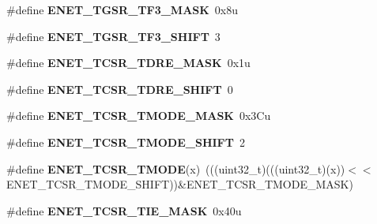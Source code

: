 \begin{DoxyCompactItemize}
\item 
\#define {\bfseries E\+N\+E\+T\+\_\+\+T\+G\+S\+R\+\_\+\+T\+F3\+\_\+\+M\+A\+SK}~0x8u\hypertarget{group__ENET__Register__Masks_ga6346ae30393bacdf198cc24bbb538c4c}{}\label{group__ENET__Register__Masks_ga6346ae30393bacdf198cc24bbb538c4c}

\item 
\#define {\bfseries E\+N\+E\+T\+\_\+\+T\+G\+S\+R\+\_\+\+T\+F3\+\_\+\+S\+H\+I\+FT}~3\hypertarget{group__ENET__Register__Masks_gaf027fca605976ae3ebfc79ba1ba3f0e4}{}\label{group__ENET__Register__Masks_gaf027fca605976ae3ebfc79ba1ba3f0e4}

\item 
\#define {\bfseries E\+N\+E\+T\+\_\+\+T\+C\+S\+R\+\_\+\+T\+D\+R\+E\+\_\+\+M\+A\+SK}~0x1u\hypertarget{group__ENET__Register__Masks_ga37a12f7e1bfb1e1c0a09b6664d09cde8}{}\label{group__ENET__Register__Masks_ga37a12f7e1bfb1e1c0a09b6664d09cde8}

\item 
\#define {\bfseries E\+N\+E\+T\+\_\+\+T\+C\+S\+R\+\_\+\+T\+D\+R\+E\+\_\+\+S\+H\+I\+FT}~0\hypertarget{group__ENET__Register__Masks_ga82b3d1ee96813bba32fb72ae120d7047}{}\label{group__ENET__Register__Masks_ga82b3d1ee96813bba32fb72ae120d7047}

\item 
\#define {\bfseries E\+N\+E\+T\+\_\+\+T\+C\+S\+R\+\_\+\+T\+M\+O\+D\+E\+\_\+\+M\+A\+SK}~0x3\+Cu\hypertarget{group__ENET__Register__Masks_gacd9d9ec96fb7eb23ef9b22525d632424}{}\label{group__ENET__Register__Masks_gacd9d9ec96fb7eb23ef9b22525d632424}

\item 
\#define {\bfseries E\+N\+E\+T\+\_\+\+T\+C\+S\+R\+\_\+\+T\+M\+O\+D\+E\+\_\+\+S\+H\+I\+FT}~2\hypertarget{group__ENET__Register__Masks_gaf43c487f5c76a9af36293da5b3360865}{}\label{group__ENET__Register__Masks_gaf43c487f5c76a9af36293da5b3360865}

\item 
\#define {\bfseries E\+N\+E\+T\+\_\+\+T\+C\+S\+R\+\_\+\+T\+M\+O\+DE}(x)~(((uint32\+\_\+t)(((uint32\+\_\+t)(x))$<$$<$E\+N\+E\+T\+\_\+\+T\+C\+S\+R\+\_\+\+T\+M\+O\+D\+E\+\_\+\+S\+H\+I\+FT))\&E\+N\+E\+T\+\_\+\+T\+C\+S\+R\+\_\+\+T\+M\+O\+D\+E\+\_\+\+M\+A\+SK)\hypertarget{group__ENET__Register__Masks_ga3d37a6772d89ad0e435b06bae3ec125d}{}\label{group__ENET__Register__Masks_ga3d37a6772d89ad0e435b06bae3ec125d}

\item 
\#define {\bfseries E\+N\+E\+T\+\_\+\+T\+C\+S\+R\+\_\+\+T\+I\+E\+\_\+\+M\+A\+SK}~0x40u\hypertarget{group__ENET__Register__Masks_ga1a36ae4a9731e381fa9159387670143f}{}\label{group__ENET__Register__Masks_ga1a36ae4a9731e381fa9159387670143f}


\end{DoxyCompactItemize}
